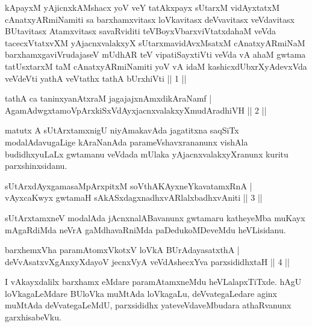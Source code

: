 \begin{shl}
kApayxM yAjicnxkAMshacx yoV veY tatAkxpayx sUtarxM vidAyxtatxM cAnatxyARmiNamiti sa barxhamxvitasx loVkavitasx deVvavitasx veVdavitasx BUtavitasx Atamxvitasx savaRviditi teVBoyxV\s barxviVtatxdahaM veVda tacecxVtatxvXM yAjacnxvalakxyX sUtarxmavidAvxMsatxM cAnatxyARmiNaM barxhamxgaviVrudajaseV mUdhAR teV vipatiSayxtiVti veVda vA ahaM gwtama tatUsxtarxM taM cAnatxyARmiNamiti yoV vA idaM kashicxdUbxrXyAdevxVda veVdeVti yathA veVtathx tathA bUrxhiVti || 1 ||
\end{shl}

\begin{shl}
tathA ca taninxyanAtxraM jagajajxnAmxdikAraNamf |\\
AgamAdwgxtamoV\s pArxkiSxVdAyxjacnxvalakxyXmudAradhiVH \hfill || 2 ||
\end{shl}

\begin{artha}
matutx A sUtArxtamxnigU niyAmakavAda jagatitxna saqSiTx modalAdavugaLige kAraNanAda parameVshavxrananunx vishAla budidhxyuLaLx gwtamanu veVdada mUlaka yAjacnxvalakxyXranunx kuritu parxshinxsidanu.
\end{artha}

\begin{shl}
sUtArxdAyxgamasaMpArxpitxM soV\s thA\s \s KAyxneYkavatamxRnA |\\
vAyxcaKwyx gwtamaH sAkASxdagxnadhxvARlalxbadhxvAniti \hfill || 3 ||
\end{shl}

\begin{artha}
sUtArxtamxneV modalAda jAcnxnalABavanunx gwtamaru katheyeMba muKayx mAgaRdiMda neVrA gaMdhavaRniMda paDedukoMDeveMdu heVLisidanu.
\end{artha}

\begin{shl}
barxhemxVha paramAtomxVkotxV loVkA BUrAdayasatxthA |\\
deVvAsatxvXgAnxyXdayoV jecnxVyA veVdAshecxYva parxsididhxtaH \hfill || 4 ||
\end{shl}

\begin{artha}
I vAkayxdalilx barxhamx eMdare paramAtamxneMdu heVLalapxTiTxde. hAgU loVkagaLeMdare BUloVka muMtAda loVkagaLu, deVvategaLedare aginx muMtAda deVvategaLeMdU, parxsididhx yateveVdaveMbudara athaRvanunx garxhisabeVku.
\end{artha}%


